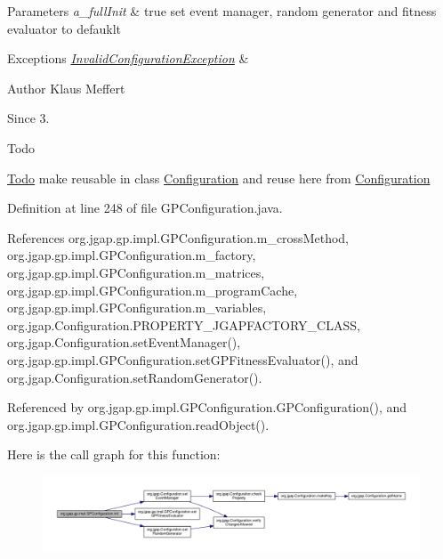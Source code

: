 \begin{DoxyParams}{Parameters}
{\em a\-\_\-full\-Init} & true set event manager, random generator and fitness evaluator to defauklt \\
\hline
\end{DoxyParams}

\begin{DoxyExceptions}{Exceptions}
{\em \hyperlink{classorg_1_1jgap_1_1_invalid_configuration_exception}{Invalid\-Configuration\-Exception}} & \\
\hline
\end{DoxyExceptions}
\begin{DoxyAuthor}{Author}
Klaus Meffert 
\end{DoxyAuthor}
\begin{DoxySince}{Since}
3. 
\end{DoxySince}
\begin{DoxyRefDesc}{Todo}
\item[\hyperlink{todo__todo000140}{Todo}]make reusable in class \hyperlink{classorg_1_1jgap_1_1_configuration}{Configuration} and reuse here from \hyperlink{classorg_1_1jgap_1_1_configuration}{Configuration} \end{DoxyRefDesc}


Definition at line 248 of file G\-P\-Configuration.\-java.



References org.\-jgap.\-gp.\-impl.\-G\-P\-Configuration.\-m\-\_\-cross\-Method, org.\-jgap.\-gp.\-impl.\-G\-P\-Configuration.\-m\-\_\-factory, org.\-jgap.\-gp.\-impl.\-G\-P\-Configuration.\-m\-\_\-matrices, org.\-jgap.\-gp.\-impl.\-G\-P\-Configuration.\-m\-\_\-program\-Cache, org.\-jgap.\-gp.\-impl.\-G\-P\-Configuration.\-m\-\_\-variables, org.\-jgap.\-Configuration.\-P\-R\-O\-P\-E\-R\-T\-Y\-\_\-\-J\-G\-A\-P\-F\-A\-C\-T\-O\-R\-Y\-\_\-\-C\-L\-A\-S\-S, org.\-jgap.\-Configuration.\-set\-Event\-Manager(), org.\-jgap.\-gp.\-impl.\-G\-P\-Configuration.\-set\-G\-P\-Fitness\-Evaluator(), and org.\-jgap.\-Configuration.\-set\-Random\-Generator().



Referenced by org.\-jgap.\-gp.\-impl.\-G\-P\-Configuration.\-G\-P\-Configuration(), and org.\-jgap.\-gp.\-impl.\-G\-P\-Configuration.\-read\-Object().



Here is the call graph for this function\-:
\nopagebreak
\begin{figure}[H]
\begin{center}
\leavevmode
\includegraphics[width=350pt]{classorg_1_1jgap_1_1gp_1_1impl_1_1_g_p_configuration_a97498de731029f37e23ac9ff7bab3de2_cgraph}
\end{center}
\end{figure}


